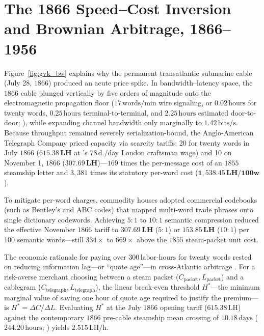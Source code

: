 \documentclass[11pt,a4paper]{article}
\newcommand{\gbp}{\symbol{"00A3}}
\begin{document}
\section{The 1866 Speed--Cost Inversion and Brownian Arbitrage, 1866--1956}
\label{sec:telegraph}

Figure~\ref{fig:gvk_bw} explains why the permanent transatlantic submarine cable (July 28, $1866$) produced an acute price spike. In bandwidth--latency space, the $1866$ cable plunged vertically by five orders of magnitude onto the electromagnetic propagation floor ($17\,\text{words/min}$ wire signaling, or $0.02\,\text{hours}$ for twenty words, $0.25\,\text{hours}$ terminal-to-terminal, and $2.25\,\text{hours}$ estimated door-to-door; \citealt{Bright1866}), while expanding channel bandwidth only marginally to $1.42\,\text{bits/s}$. Because throughput remained severely serialization-bound, the Anglo-American Telegraph Company priced capacity via scarcity tariffs: \gbp 20 for twenty words in July $1866$ ($\mathbf{615.38\,\text{LH}}$ at \citealt{Bowley1900}'s $78\,\text{d.}$/day London craftsman wage) and \gbp 10 on November 1, $1866$ ($\mathbf{307.69\,\text{LH}}$)---$169$ times the per-message cost of an $1855$ steamship letter and $3,381$ times its statutory per-word cost ($\mathbf{1,538.45\,\text{LH/100w}}$).

To mitigate per-word charges, commodity houses adopted commercial codebooks (such as Bentley's and ABC codes) that mapped multi-word trade phrases onto single dictionary codewords. Achieving $5{:}1$ to $10{:}1$ semantic compression reduced the effective November $1866$ tariff to $\mathbf{307.69\,\text{LH}}$ ($5{:}1$) or $\mathbf{153.85\,\text{LH}}$ ($10{:}1$) per 100 semantic words---still $334\times$ to $669\times$ above the $1855$ steam-packet unit cost.

The economic rationale for paying over $300\,\text{labor-hours}$ for twenty words rested on reducing information lag---or ``quote age''---in cross-Atlantic arbitrage \citep{Pred1973}. For a risk-averse merchant choosing between a steam packet ($C_{\text{packet}}, L_{\text{packet}}$) and a cablegram ($C_{\text{telegraph}}, L_{\text{telegraph}}$), the linear break-even threshold $H^*$---the minimum marginal value of saving one hour of quote age required to justify the premium---is $H^* = \Delta C / \Delta L$. Evaluating $H^*$ at the July $1866$ opening tariff ($615.38\,\text{LH}$) against the contemporary $1866$ pre-cable steamship mean crossing of $10.18\,\text{days}$ ($244.20\,\text{hours}$; \citealt{Steinwender2018}) yields $2.515\,\text{LH/h}$.
\end{document}

